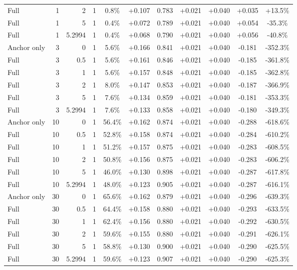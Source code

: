 \begin{table}[htbp]
\begin{tabular}{lrrrccccccc}
Full & 1 & 2 & 1 & 0.8\% & +0.107 & 0.783 & +0.021 & +0.040 & +0.035 & +13.5\% \\
Full & 1 & 5 & 1 & 0.4\% & +0.072 & 0.789 & +0.021 & +0.040 & +0.054 & -35.3\% \\
Full & 1 & 5.2994 & 1 & 0.4\% & +0.068 & 0.790 & +0.021 & +0.040 & +0.056 & -40.8\% \\
Anchor only & 3 & 0 & 1 & 5.6\% & +0.166 & 0.841 & +0.021 & +0.040 & -0.181 & -352.3\% \\
Full & 3 & 0.5 & 1 & 5.6\% & +0.161 & 0.846 & +0.021 & +0.040 & -0.185 & -361.8\% \\
Full & 3 & 1 & 1 & 5.6\% & +0.157 & 0.848 & +0.021 & +0.040 & -0.185 & -362.8\% \\
Full & 3 & 2 & 1 & 8.0\% & +0.147 & 0.853 & +0.021 & +0.040 & -0.187 & -366.9\% \\
Full & 3 & 5 & 1 & 7.6\% & +0.134 & 0.859 & +0.021 & +0.040 & -0.181 & -353.3\% \\
Full & 3 & 5.2994 & 1 & 7.6\% & +0.133 & 0.858 & +0.021 & +0.040 & -0.180 & -349.3\% \\
Anchor only & 10 & 0 & 1 & 56.4\% & +0.162 & 0.874 & +0.021 & +0.040 & -0.288 & -618.6\% \\
Full & 10 & 0.5 & 1 & 52.8\% & +0.158 & 0.874 & +0.021 & +0.040 & -0.284 & -610.2\% \\
Full & 10 & 1 & 1 & 51.2\% & +0.157 & 0.875 & +0.021 & +0.040 & -0.283 & -608.5\% \\
Full & 10 & 2 & 1 & 50.8\% & +0.156 & 0.875 & +0.021 & +0.040 & -0.283 & -606.2\% \\
Full & 10 & 5 & 1 & 46.0\% & +0.130 & 0.898 & +0.021 & +0.040 & -0.287 & -617.8\% \\
Full & 10 & 5.2994 & 1 & 48.0\% & +0.123 & 0.905 & +0.021 & +0.040 & -0.287 & -616.1\% \\
Anchor only & 30 & 0 & 1 & 65.6\% & +0.162 & 0.879 & +0.021 & +0.040 & -0.296 & -639.3\% \\
Full & 30 & 0.5 & 1 & 64.4\% & +0.158 & 0.880 & +0.021 & +0.040 & -0.293 & -633.5\% \\
Full & 30 & 1 & 1 & 62.4\% & +0.156 & 0.880 & +0.021 & +0.040 & -0.292 & -630.5\% \\
Full & 30 & 2 & 1 & 59.6\% & +0.155 & 0.880 & +0.021 & +0.040 & -0.291 & -626.1\% \\
Full & 30 & 5 & 1 & 58.8\% & +0.130 & 0.900 & +0.021 & +0.040 & -0.290 & -625.5\% \\
Full & 30 & 5.2994 & 1 & 59.6\% & +0.123 & 0.907 & +0.021 & +0.040 & -0.290 & -625.3\% \\

\end{tabular}
\end{table}

